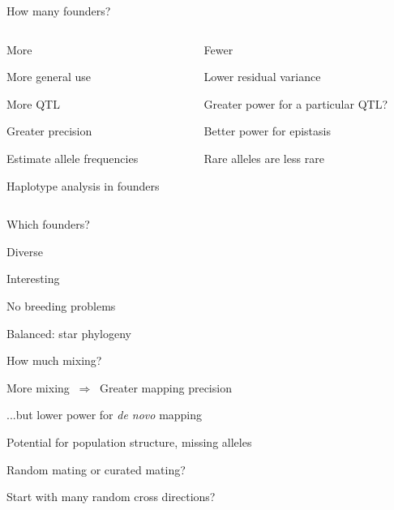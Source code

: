 \documentclass[12pt,t,aspectratio=169]{beamer}
\begin{document}
\begin{frame}{How many founders?}

\vspace{8mm}

  \begin{columns}

    \begin{column}{0.5\textwidth}
      {\hilit More}

{\small
\bi
\item More general use
\item More QTL
\item Greater precision
\item Estimate allele frequencies
\item Haplotype analysis in founders
  \ei
}

    \end{column}

    \begin{column}{0.5\textwidth}
      {\hilit Fewer}

{\small
\bi
\item Lower residual variance
\item Greater power for a particular QTL?
\item Better power for epistasis
\item Rare alleles are less rare
\ei
}
    \end{column}


  \end{columns}


\end{frame}



\begin{frame}[c]{Which founders?}

  \bbi
\item Diverse
\item Interesting
\item No breeding problems
\item Balanced: star phylogeny
  \ei

\end{frame}


\begin{frame}[c]{How much mixing?}

  \bbi
  \item More mixing $ \ \Rightarrow \ $ Greater mapping precision
\item ...but lower power for \emph{de novo\/} mapping
\item Potential for population structure, missing alleles
\item \hilit Random mating or curated mating?
\item \hilit Start with many random cross directions?
  \ei

\end{frame}
\end{document}
